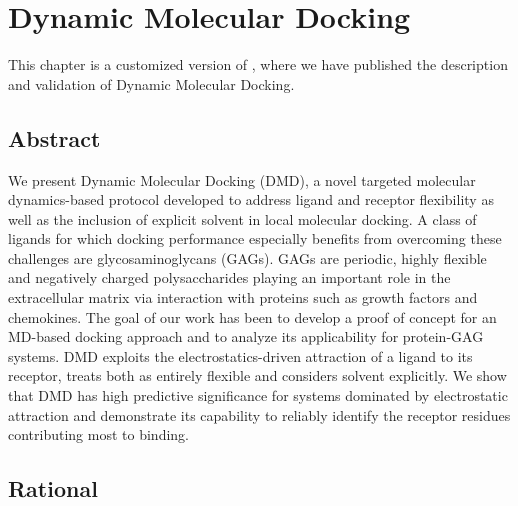 \chapter{Dynamic Molecular Docking}

This chapter is a customized version of \cite{dmd_samsonov_gehrcke_2014}, where
we have published the description and validation of Dynamic Molecular Docking.


\section{Abstract}
We present Dynamic Molecular Docking (DMD), a novel
targeted molecular dy\-namics-based protocol developed to address ligand and
receptor flexibility as well as the inclusion of explicit solvent in local
molecular docking. A class of ligands for which docking performance especially
benefits from overcoming these challenges are glycosaminoglycans (GAGs). GAGs
are periodic, highly flexible and negatively charged polysaccharides playing an
important role in the extracellular matrix via interaction with proteins such as
growth factors and chemokines. The goal of our work has been to develop a proof
of concept for an MD-based docking approach and to analyze its applicability for
protein-GAG systems. DMD exploits the electrostatics-driven attraction of a
ligand to its receptor, treats both as entirely flexible and considers solvent
explicitly. We show that DMD has high predictive significance for systems
dominated by electrostatic attraction and demonstrate its capability to reliably
identify the receptor residues contributing most to binding.

\section{Rational}

